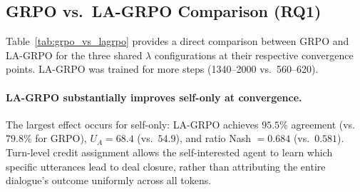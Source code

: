 \documentclass[12pt,a4paper]{article}
\renewcommand{\arraystretch}{1.25}
\begin{document}
\subsection{GRPO vs.\ LA-GRPO Comparison (RQ1)}\label{sec:grpo_vs_lagrpo}

Table~\ref{tab:grpo_vs_lagrpo} provides a direct comparison between GRPO and LA-GRPO for the three shared $\lambda$ configurations at their respective convergence points. LA-GRPO was trained for more steps (1340--2000 vs.\ 560--620).

\begin{table}[H]
\centering
\caption[GRPO vs.\ LA-GRPO comparison on the same $\lambda$ configurations.]{GRPO vs.\ LA-GRPO comparison on the same $\lambda$ configurations. Agreed ratio Nash measures per-deal cooperative quality.}
\label{tab:grpo_vs_lagrpo}
\renewcommand{\arraystretch}{1.15}
\end{table}

\paragraph{LA-GRPO substantially improves self-only at convergence.} The largest effect occurs for self-only: LA-GRPO achieves $95.5\%$ agreement (vs.\ $79.8\%$ for GRPO), $U_A = 68.4$ (vs.\ $54.9$), and ratio Nash $= 0.684$ (vs.\ $0.581$). Turn-level credit assignment allows the self-interested agent to learn which specific utterances lead to deal closure, rather than attributing the entire dialogue's outcome uniformly across all tokens.
\end{document}
